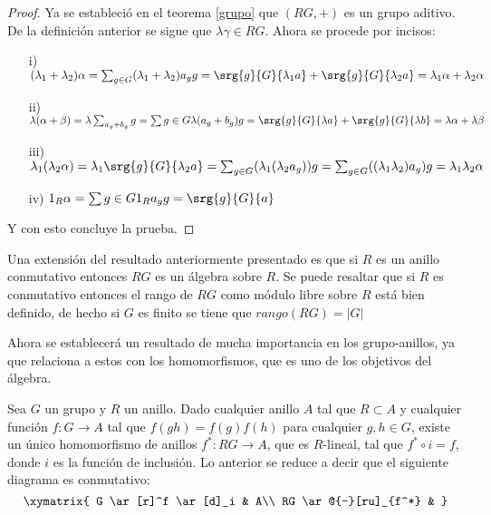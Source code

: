 \begin{proof}
Ya se estableció en el teorema \ref{grupo} que $(RG,+)$ es un grupo aditivo. De la definición anterior se sigue que $\lambda\gamma \in RG$. Ahora se procede por incisos: 
\begin{itemize}
\item[i)] $(\lambda_1+\lambda_2)\alpha = \sum_{g \in G} (\lambda_1+\lambda_2)a_gg = \srg{g}{G}{\lambda_1 a} + \srg{g}{G}{\lambda_2 a} = \lambda_1\alpha + \lambda_2\alpha$
\item[ii)] $\lambda(\alpha + \beta) = \lambda\sum_{a_g+b_g}g = \sum{g \in G}\lambda(a_g+b_g)g = \srg{g}{G}{\lambda a} + \srg{g}{G}{\lambda b} = \lambda\alpha + \lambda\beta$
\item [iii)] $\lambda_1(\lambda_2\alpha) = \lambda_1\srg{g}{G}{\lambda_2 a} = \sum_{g\in G}(\lambda_1(\lambda_2 a_g))g = \sum_{g\in G}((\lambda_1\lambda_2)a_g)g = \lambda_1\lambda_2\alpha$
\item[iv)] $1_R\alpha = \sum{g \in G}1_Ra_gg = \srg{g}{G}{a}$
\end{itemize}
Y con esto concluye la prueba. \qedhere

\end{proof}

Una extensión del resultado anteriormente presentado es que si $R$ es un anillo conmutativo entonces $RG$ es un álgebra sobre $R$. Se puede resaltar que si $R$ es conmutativo  entonces el rango de $RG$ como módulo libre sobre $R$ está bien definido, de hecho si $G$ es finito se tiene que $rango(RG) = |G|$

Ahora se establecerá un resultado de mucha importancia en los grupo-anillos, ya que relaciona a estos con los homomorfismos, que es uno de los objetivos del álgebra.

\begin{proposicion}\label{up}
Sea $G$ un grupo y $R$ un anillo. Dado cualquier anillo $A$ tal que $R \subset A$ y cualquier función $f \colon G \to A$ tal que $f(gh) = f(g)f(h)$ para cualquier $g,h \in G$, existe un único homomorfismo de anillos $f^* \colon  RG \to A$, que es $R$-lineal, tal que $f^*\circ i = f$, donde $i$ es la función de inclusión. Lo anterior se reduce a decir que el siguiente diagrama es conmutativo:
\[\xymatrix { G \ar[r]^f 
\ar[d]_i & A\\
RG \ar@{--}[ru]_{f^*} & }\]
\end{proposicion}

